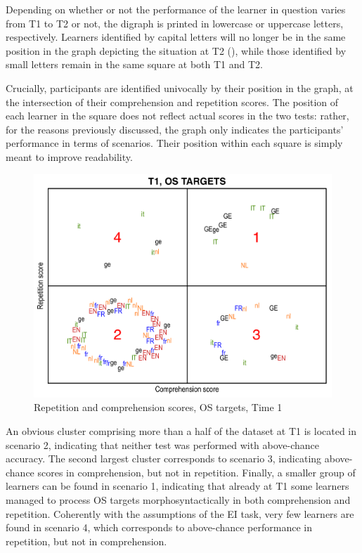 Depending on whether or not the performance of the learner in question varies from T1 to T2 or not, the digraph is printed in lowercase or uppercase letters, respectively. Learners identified by capital letters will no longer be in the same position in the graph depicting the situation at T2 (), while those identified by small letters remain in the same square at both T1 and T2. 

Crucially, participants are identified univocally by their position in the graph, at the intersection of their comprehension and repetition scores. The position of each learner in the square does not reflect actual scores in the two tests: rather, for the reasons previously discussed, the graph only indicates the participants’ performance in terms of scenarios. Their position within each square is simply meant to improve readability. 

\begin{figure}
    \includegraphics[width=\textwidth]{figures/06-2.pdf}
    \caption{Repetition and comprehension scores, OS targets, Time 1}
    \label{fig:06:2}
\end{figure}

An obvious cluster comprising more than a half of the dataset at T1 is located in scenario 2, indicating that neither test was performed with above-chance accuracy. The second largest cluster corresponds to scenario 3, indicating above-chance scores in comprehension, but not in repetition. Finally, a smaller group of learners can be found in scenario 1, indicating that already at T1 some learners managed to process OS targets morphosyntactically in both comprehension and repetition. Coherently with the assumptions of the EI task, very few learners are found in scenario 4, which corresponds to above-chance performance in repetition, but not in comprehension.

